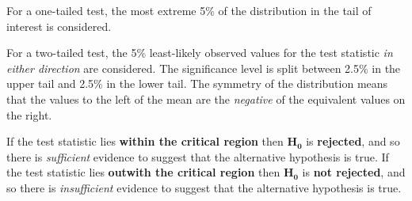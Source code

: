 \documentclass[
  11pt,
]{book}
\begin{document}
\begin{figure}[H]
\begin{minipage}{.333\textwidth}
\end{minipage}%
  \centering
\begin{minipage}{.333\textwidth}
  \centering
{}
\end{minipage}
\end{figure}

For a one-tailed test, the most extreme 5\% of the distribution in the tail of interest is considered.

For a two-tailed test, the 5\% least-likely observed values for the test statistic \emph{in either direction} are considered. The significance level is split between 2.5\% in the upper tail and 2.5\% in the lower tail. The symmetry of the distribution means that the values to the left of the mean are the \emph{negative} of the equivalent values on the right.

If the test statistic lies \textbf{within the critical region} then \(\mathbf{\text{H}_\text{0}}\) is \textbf{rejected}, and so there is \textit{sufficient} evidence to suggest that the alternative hypothesis is true. If the test statistic lies \textbf{outwith the critical region} then \(\mathbf{\text{H}_\text{0}}\) is \textbf{not rejected}, and so there is \textit{insufficient} evidence to suggest that the alternative hypothesis is true.
\end{document}
